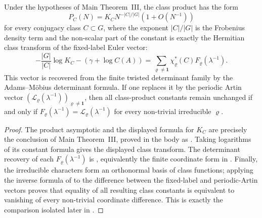 \begin{proposition}
  \label{prop:intro-class-product-calibration}
  Under the hypotheses of Main Theorem~III, the class product has the form
  \[
    P_C(N)=K_C N^{-|C|/|G|}(1+O(N^{-1}))
  \]
  for every conjugacy class \(C\subset G\), where the exponent
  \(|C|/|G|\) is the Frobenius density term and the non-scalar part of the
  constant is exactly the Hermitian class transform of the fixed-label Euler
  vector:
  \[
    -\frac{|G|}{|C|}\log K_C-(\gamma+
    \log C(A))
    =
    \sum_{\varrho\ne\mathbf1}
      \chi_\varrho^\ast(C)F_\varrho(\lambda^{-1}).
  \]
  This vector is recovered from the finite twisted determinant family by the
  Adams--M\"obius determinant formula.  If one replaces it by the periodic
  Artin vector
  \((\mathcal L_\varrho(\lambda^{-1}))_{\varrho\ne\mathbf1}\), then all
  class-product constants remain unchanged if and only if
  \(F_\varrho(\lambda^{-1})=
  \mathcal L_\varrho(\lambda^{-1})\) for every non-trivial irreducible
  \(\varrho\).
\end{proposition}
\begin{proof}
  The product asymptotic and the displayed formula for \(K_C\) are precisely
  the conclusion of Main Theorem~III, proved in the body as
  .  Taking logarithms of its constant
  formula gives the displayed class transform.  The determinant recovery of
  each \(F_\varrho(\lambda^{-1})\) is
  , equivalently the finite
  coordinate form in .  Finally,
  the irreducible characters form an orthonormal basis of class functions;
  applying the inverse formula of
   to the difference
  between the fixed-label and periodic-Artin vectors proves that equality of
  all resulting class constants is equivalent to vanishing of every
  non-trivial coordinate difference.  This is exactly the comparison isolated
  later in .
\end{proof}

